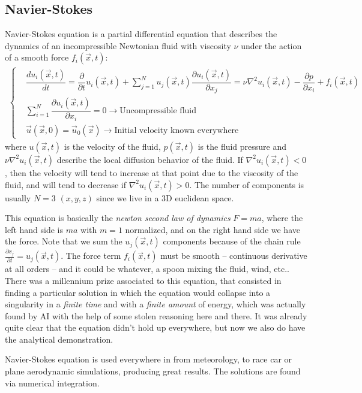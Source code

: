 \documentclass[12pt,a4paper]{article}
\begin{document}
\subsection{Navier-Stokes}
Navier-Stokes equation is a partial differential equation that describes the dynamics of an incompressible Newtonian fluid with viscosity $\nu$ under the action of a smooth force $f_i(\vec{x}, t)$:
\begin{align*}
\begin{cases}
	&\dfrac{d u_i (\vec{x}, t)}{dt} = \dfrac{\partial}{\partial t}u_i(\vec{x}, t) + \sum_{j=1}^{N}u_j(\vec{x}, t) \dfrac{\partial u_i(\vec{x}, t)}{\partial x_j} = \nu \nabla^2 u_i(\vec{x}, t) - \dfrac{\partial p}{\partial x_i} + f_i(\vec{x}, t)\\[8pt]
	&\sum_{i=1}^{N} \dfrac{\partial u_i(\vec{x}, t)}{\partial x_i} = 0 \rightarrow \text{Uncompressible fluid}\\[8pt]
	&\vec{u}(\vec{x}, 0) = \vec{u}_0(\vec{x}) \rightarrow \text{Initial velocity known everywhere}
\end{cases}
\end{align*}
where $u(\vec{x}, t)$ is the velocity of the fluid, $p(\vec{x}, t)$ is the fluid pressure and $\nu \nabla^2 u_i(\vec{x}, t)$ describe the local diffusion behavior of the fluid. If $\nabla^2 u_i(\vec{x}, t)<0$, then the velocity will tend to increase at that point due to the viscosity of the fluid, and will tend to decrease if $\nabla^2 u_i(\vec{x}, t)>0$.
The number of components is usually $N=3$ $(x,y,z)$ since we live in a 3D euclidean space.

This equation is basically the \textit{newton second law of dynamics} $F=ma$, where the left hand side is $ma$ with $m=1$ normalized, and on the right hand side we have the force. Note that we sum the $u_j(\vec{x}, t)$ components because of the chain rule $\frac{\partial x_j}{\partial t} = u_j(\vec{x}, t)$.
The force term $f_i(\vec{x}, t)$ must be smooth -- continuous derivative at all orders -- and it could be whatever, a spoon mixing the fluid, wind, etc..
There was a millennium prize associated to this equation, that consisted in finding a particular solution in which the equation would collapse into a singularity in a \textit{finite time} and with a \textit{finite amount} of energy, which was actually found by AI with the help of some stolen reasoning here and there. It was already quite clear that the equation didn't hold up everywhere, but now we also do have the analytical demonstration.

Navier-Stokes equation is used everywhere in from meteorology, to race car or plane aerodynamic simulations, producing great results. The solutions are found via numerical integration.
\end{document}
